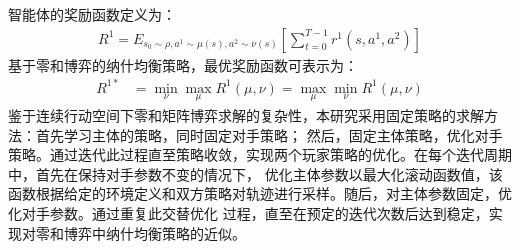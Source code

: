 智能体的奖励函数定义为：
\begin{align}
    R^{1}=E_{s_{0} \sim \rho, a^{1} \sim \mu(s), a^{2} \sim \nu(s)}\left[\sum_{t=0}^{T-1} r^{1}\left(s, a^{1}, a^{2}\right)\right]
\end{align}
基于零和博弈的纳什均衡策略，最优奖励函数可表示为：
\begin{align}
    R^{1 *} & = \min _{\nu} \max _{\mu} R^{1}(\mu, \nu) = \max _{\mu} \min _{\nu} R^{1}(\mu, \nu)
\end{align}
鉴于连续行动空间下零和矩阵博弈求解的复杂性，本研究采用固定策略的求解方法：首先学习主体的策略，同时固定对手策略；
然后，固定主体策略，优化对手策略。通过迭代此过程直至策略收敛，实现两个玩家策略的优化。在每个迭代周期中，首先在保持对手参数不变的情况下，
优化主体参数以最大化滚动函数值，该函数根据给定的环境定义和双方策略对轨迹进行采样。随后，对主体参数固定，优化对手参数。通过重复此交替优化
过程，直至在预定的迭代次数后达到稳定，实现对零和博弈中纳什均衡策略的近似。

